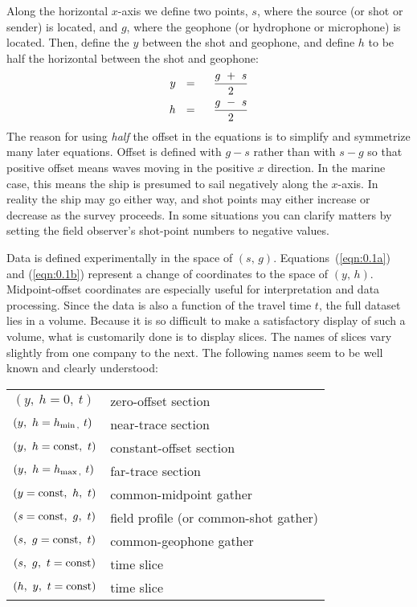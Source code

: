 \par
Along the horizontal $x$-axis we define two points,
$s$, where the source (or shot or sender) is located,
and  $g$, where the geophone (or hydrophone or microphone) is located.
Then, define the   $y$  between the
shot and geophone, and
define  $h$  to be half the horizontal 
between the shot and geophone:
\begin{eqnarray}
y\ \ &=&\ \ {g \ +\  s  \over 2 }
\label{eqn:0.1a}
\\
h\ \ &=&\ \ {g \ -\  s  \over 2 }
\label{eqn:0.1b}
\end{eqnarray}
The reason for using
{\em half}
the offset in the equations
is to simplify and symmetrize many later equations.
Offset is defined
with  $g - s$  rather than with  $s - g$  so that
positive offset means waves
moving in the positive  $x$ direction.
In the marine case, this means the ship is presumed to sail
negatively along the  $x$-axis.
In reality the ship may go either way,
and shot points may either increase or decrease as the survey proceeds.
In some situations you can clarify matters by setting the
field observer's shot-point numbers to negative values.
\par
Data is defined experimentally in the space of  $(s,\,g)$.
Equations~(\ref{eqn:0.1a}) and (\ref{eqn:0.1b})
represent a change of coordinates to the space of $(y,\,h)$.
Midpoint-offset coordinates are especially useful
for interpretation and data processing.
Since the data is also a function of the travel time  $t$,
the full dataset lies in a volume.
Because it is so difficult to make a satisfactory display of such a volume,
what is customarily done is to display slices.
The names of slices vary slightly from one company to the next.
The following names seem to be well known and clearly understood:
\begin{center}
\begin{tabular}{lp{2.75in}}
$(y,\ h = 0,\ t)$       & zero-offset section \\
$(y,\ h = h_{\rm min\,,}\  t)$ & near-trace section \\
$(y,\ h = \hbox{const} ,\  t)$ &        constant-offset section \\
$(y,\ h = h_{\rm max\,,}\  t)$ & far-trace section \\
$(y = \hbox{const} ,\  h,\  t)$ & common-midpoint gather \\
$(s = \hbox{const} ,\  g,\  t)$ & field profile (or common-shot gather) \\
$(s,\ g = \hbox{const} ,\  t)$ & common-geophone gather \\
$(s,\ g,\ t = \hbox{const} )$ & time slice \\
$(h,\ y,\ t = \hbox{const} )$ & time slice \\
\end{tabular}
\end{center}
